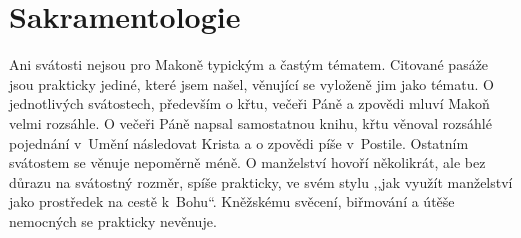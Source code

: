 \section{Sakramentologie}

Ani svátosti nejsou pro Makoně typickým a častým tématem. Citované pasáže jsou
prakticky jediné, které jsem našel, věnující se vyloženě jim jako tématu. O
jednotlivých svátostech, především o křtu, večeři Páně a zpovědi mluví Makoň velmi
rozsáhle. O večeři Páně napsal samostatnou knihu\cite{KaMaMse}, křtu věnoval
rozsáhlé pojednání v~Umění následovat Krista\cite{KaMaUNK} a o zpovědi píše
v~Postile\cite{KaMaPost}. Ostatním svátostem
se věnuje nepoměrně méně. O manželství hovoří několikrát, ale bez důrazu na
svátostný rozměr, spíše prakticky, ve svém stylu ,,jak využít manželství jako
prostředek na cestě k~Bohu``. Kněžskému svěcení, biřmování a útěše nemocných se
prakticky nevěnuje.

